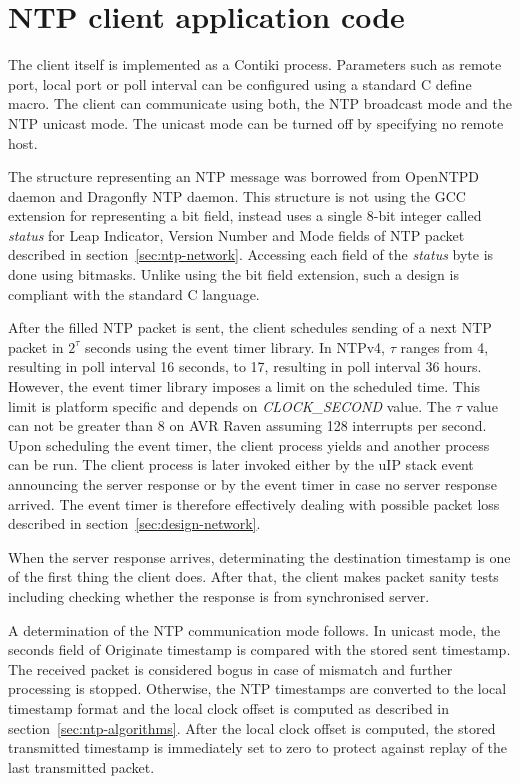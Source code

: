 
\section{NTP client application code}
The client itself is implemented as a Contiki process.
Parameters such as remote port, local port or poll interval %
can be configured using a standard C define macro.
The client can communicate using both,
the NTP broadcast mode and the NTP unicast mode.
The unicast mode can be turned off by specifying no remote host.

The structure representing an NTP message was borrowed from OpenNTPD daemon
and Dragonfly NTP daemon.
This structure is not using the GCC extension for representing a bit field,
instead uses a single 8-bit integer called {\it{status}}
for Leap Indicator, Version Number and Mode fields of NTP packet
described in section~\ref{sec:ntp-network}.
Accessing each field of the {\it{status}} byte is done using bitmasks.
Unlike using the bit field extension,
such a design is compliant with the standard C language.

After the filled NTP packet is sent, the client schedules
sending of a next NTP packet in $2^{\tau}$ seconds
using the event timer library.
In NTPv4, $\tau$ ranges from 4, resulting in poll interval 16 seconds,
to 17, resulting in poll interval 36 hours.
However, the event timer library imposes a limit on the scheduled time.
This limit is platform specific and depends on {\it{CLOCK\_SECOND}} value.
The $\tau$ value can not be greater than 8 on AVR Raven assuming 128 interrupts per second.
Upon scheduling the event timer, the client process yields
and another process can be run.
The client process is later invoked either by the uIP stack event
announcing the server response
or by the event timer in case no server response arrived.
The event timer is therefore effectively
dealing with possible packet loss described in section~\ref{sec:design-network}.

When the server response arrives,
determinating the destination timestamp is one of the first thing the client does.
After that, the client makes packet sanity tests including
checking whether the response is from synchronised server.

A determination of the NTP communication mode follows.
In unicast mode, the seconds field of Originate timestamp
is compared with the stored sent timestamp.
The received packet is considered bogus in case of mismatch and further processing is stopped.
Otherwise, the NTP timestamps are converted to the local timestamp format and
the local clock offset is computed as described in section~\ref{sec:ntp-algorithms}.
After the local clock offset is computed,
the stored transmitted timestamp is immediately set to zero
to protect against replay of the last transmitted packet.


